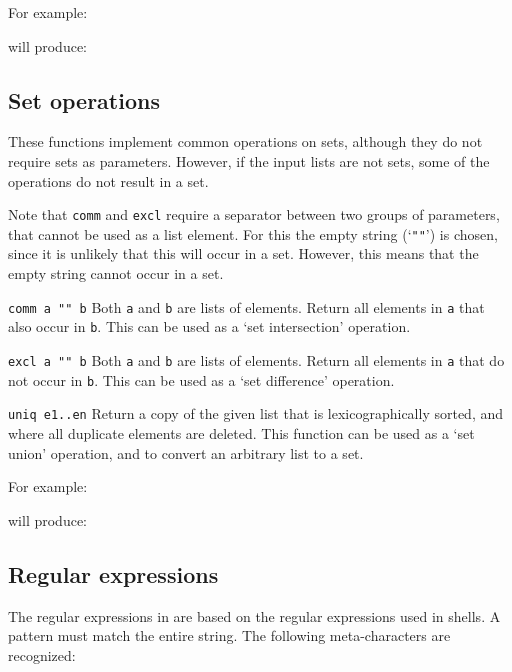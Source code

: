 For example:
\begin{showfile}

\end{showfile}
will produce:
\begin{showfile}

\end{showfile}

\subsection{Set operations}
\nopagebreak
These functions implement common operations on sets,
although they do not require sets as parameters.
However, if the input lists are not sets, some of the operations do not
result in a set.

Note that \texttt{comm} and \texttt{excl} require a separator between
two groups of parameters, that cannot be used as a list element.
For this the empty string (`\texttt{""}') is chosen,
since it is unlikely that this will occur in a set.
However, this means that the empty string cannot occur in a set.

\begin{desctab}
\item[\texttt{comm a "" b}]
Both \texttt{a} and \texttt{b} are lists of elements.
Return all elements in \texttt{a} that also occur in \texttt{b}.
This can be used as a `set intersection' operation.

\item[\texttt{excl a "" b}]
Both \texttt{a} and \texttt{b} are lists of elements.
Return all elements in \texttt{a} that do not occur in \texttt{b}.
This can be used as a `set difference' operation.

\item[\texttt{uniq e1..en}]
Return a copy of the given list that is lexicographically sorted,
and where all duplicate elements are deleted.
This function can be used as a `set union' operation, and to convert
an arbitrary list to a set.

\end{desctab}
For example:
\begin{showfile}

\end{showfile}
will produce:
\begin{showfile}

\end{showfile}

\subsection{Regular expressions}
\label{s.regex}
The regular expressions in {\Tm} are based on the regular expressions
used in {\Unix} shells.  A pattern must match the entire string.
The following meta-characters are recognized:

